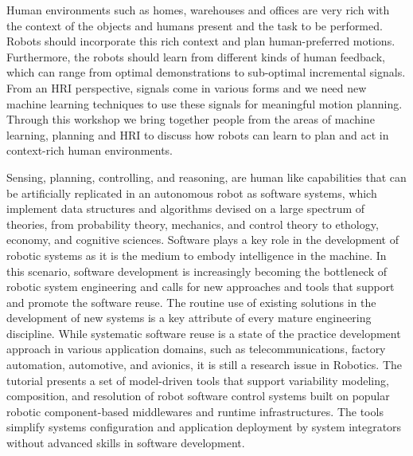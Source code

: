 \begin{spacing}{1.0}
{Human environments such as homes, warehouses and offices are very rich with the context of the objects and humans present and the task to be performed. Robots should incorporate this rich context and plan human-preferred motions. Furthermore, the robots should learn from different kinds of human feedback, which can range from optimal demonstrations to sub-optimal incremental signals. From an HRI perspective, signals come in various forms and we need new machine learning techniques to use these signals for meaningful motion planning. Through this workshop we bring together people from the areas of machine learning, planning and HRI to discuss how robots can learn to plan and act in context-rich human environments.
}


{
Sensing, planning, controlling, and reasoning, are human like capabilities that can be artificially replicated in an autonomous robot as software systems, which implement data structures and algorithms devised on a large spectrum of theories, from probability theory, mechanics, and control theory to ethology, economy, and cognitive sciences. Software plays a key role in the development of robotic systems as it is the medium to embody intelligence in the machine. In this scenario, software development is increasingly becoming the bottleneck of robotic system engineering and calls for new approaches and tools that support and promote the software reuse. The routine use of existing solutions in the development of new systems is a key attribute of every mature engineering discipline. While systematic software reuse is a state of the practice development approach in various application domains, such as telecommunications, factory automation, automotive, and avionics, it is still a research issue in Robotics. The tutorial presents a set of model-driven tools that support variability modeling, composition, and resolution of robot software control systems built on popular robotic component-based middlewares and runtime infrastructures. The tools simplify systems configuration and application deployment by system integrators without advanced skills in software development.

}




\end{spacing}

